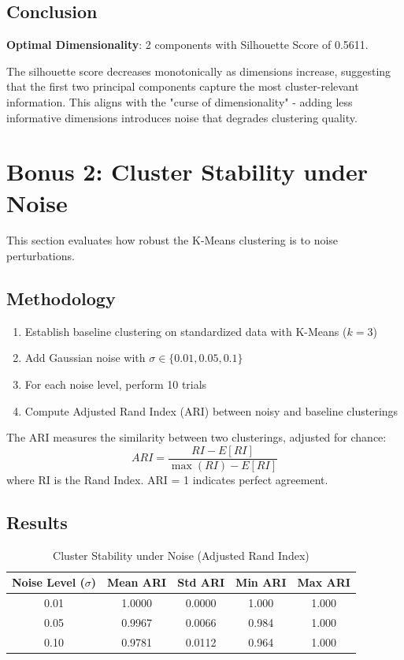 \documentclass[12pt,a4paper]{article}
\begin{document}
\subsection{Conclusion}

\textbf{Optimal Dimensionality}: 2 components with Silhouette Score of 0.5611.

The silhouette score decreases monotonically as dimensions increase, suggesting that the first two principal components capture the most cluster-relevant information. This aligns with the "curse of dimensionality" - adding less informative dimensions introduces noise that degrades clustering quality.

\section{Bonus 2: Cluster Stability under Noise}

This section evaluates how robust the K-Means clustering is to noise perturbations.

\subsection{Methodology}

\begin{enumerate}
    \item Establish baseline clustering on standardized data with K-Means ($k=3$)
    \item Add Gaussian noise with $\sigma \in \{0.01, 0.05, 0.1\}$
    \item For each noise level, perform 10 trials
    \item Compute Adjusted Rand Index (ARI) between noisy and baseline clusterings
\end{enumerate}

The ARI measures the similarity between two clusterings, adjusted for chance:
\[
ARI = \frac{RI - E[RI]}{\max(RI) - E[RI]}
\]
where RI is the Rand Index. ARI = 1 indicates perfect agreement.

\subsection{Results}

\begin{table}[H]
\centering
\caption{Cluster Stability under Noise (Adjusted Rand Index)}
\label{tab:stability}
\begin{tabular}{ccccc}
\toprule
\textbf{Noise Level ($\sigma$)} & \textbf{Mean ARI} & \textbf{Std ARI} & \textbf{Min ARI} & \textbf{Max ARI} \\
\midrule
0.01 & 1.0000 & 0.0000 & 1.000 & 1.000 \\
0.05 & 0.9967 & 0.0066 & 0.984 & 1.000 \\
0.10 & 0.9781 & 0.0112 & 0.964 & 1.000 \\
\bottomrule
\end{tabular}
\end{table}
\end{document}
